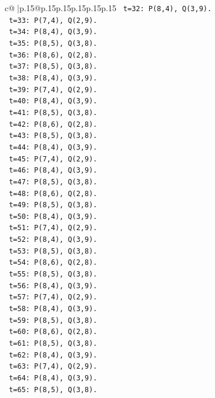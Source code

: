 \documentclass{article}
\begin{document}
{\begin{supertabular}{c@{$\;$}|p{.15\linewidth}@{}p{.15\linewidth}p{.15\linewidth}p{.15\linewidth}p{.15\linewidth}p{.15\linewidth}}
{{{\texttt{   t=32: P(8,4), Q(3,9).} \\
\texttt{   t=33: P(7,4), Q(2,9).} \\
\texttt{   t=34: P(8,4), Q(3,9).} \\
\texttt{   t=35: P(8,5), Q(3,8).} \\
\texttt{   t=36: P(8,6), Q(2,8).} \\
\texttt{   t=37: P(8,5), Q(3,8).} \\
\texttt{   t=38: P(8,4), Q(3,9).} \\
\texttt{   t=39: P(7,4), Q(2,9).} \\
\texttt{   t=40: P(8,4), Q(3,9).} \\
\texttt{   t=41: P(8,5), Q(3,8).} \\
\texttt{   t=42: P(8,6), Q(2,8).} \\
\texttt{   t=43: P(8,5), Q(3,8).} \\
\texttt{   t=44: P(8,4), Q(3,9).} \\
\texttt{   t=45: P(7,4), Q(2,9).} \\
\texttt{   t=46: P(8,4), Q(3,9).} \\
\texttt{   t=47: P(8,5), Q(3,8).} \\
\texttt{   t=48: P(8,6), Q(2,8).} \\
\texttt{   t=49: P(8,5), Q(3,8).} \\
\texttt{   t=50: P(8,4), Q(3,9).} \\
\texttt{   t=51: P(7,4), Q(2,9).} \\
\texttt{   t=52: P(8,4), Q(3,9).} \\
\texttt{   t=53: P(8,5), Q(3,8).} \\
\texttt{   t=54: P(8,6), Q(2,8).} \\
\texttt{   t=55: P(8,5), Q(3,8).} \\
\texttt{   t=56: P(8,4), Q(3,9).} \\
\texttt{   t=57: P(7,4), Q(2,9).} \\
\texttt{   t=58: P(8,4), Q(3,9).} \\
\texttt{   t=59: P(8,5), Q(3,8).} \\
\texttt{   t=60: P(8,6), Q(2,8).} \\
\texttt{   t=61: P(8,5), Q(3,8).} \\
\texttt{   t=62: P(8,4), Q(3,9).} \\
\texttt{   t=63: P(7,4), Q(2,9).} \\
\texttt{   t=64: P(8,4), Q(3,9).} \\
\texttt{   t=65: P(8,5), Q(3,8).} \\
}}}
\end{supertabular}}
\end{document}
